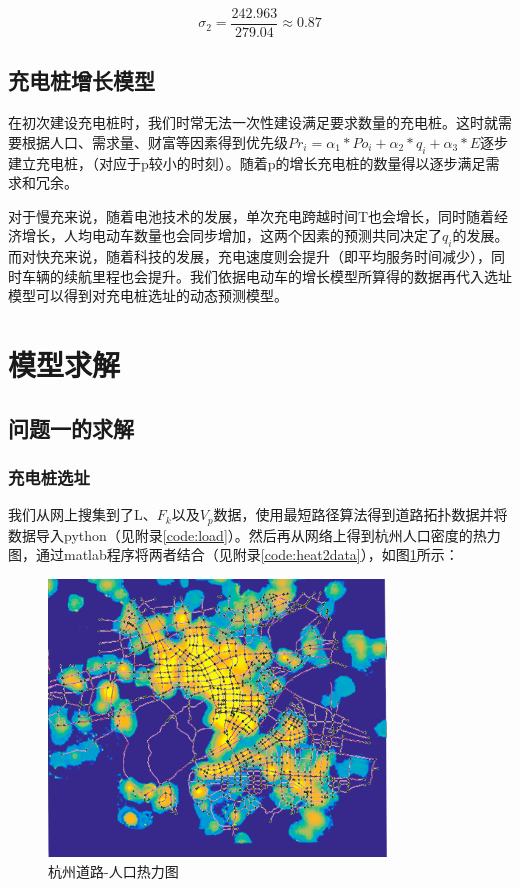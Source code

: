 \documentclass[12pt, a4paper, oneside]{ctexart}
\begin{document}
\begin{equation}
  \sigma_2= \frac{242.963}{279.04} \approx0.87
\end{equation}


\subsection{充电桩增长模型}
在初次建设充电桩时，我们时常无法一次性建设满足要求数量的充电桩。这时就需要根据人口、需求量、财富等因素得到优先级\(Pr_i=\alpha_1*Po_i+\alpha_2*q_i+\alpha_3*E\)逐步建立充电桩，（对应于p较小的时刻）。随着p的增长充电桩的数量得以逐步满足需求和冗余。

对于慢充来说，随着电池技术的发展，单次充电跨越时间T也会增长，同时随着经济增长，人均电动车数量也会同步增加，这两个因素的预测共同决定了\(q_i\)的发展。而对快充来说，随着科技的发展，充电速度则会提升（即平均服务时间减少），同时车辆的续航里程也会提升。我们依据电动车的增长模型所算得的数据再代入选址模型可以得到对充电桩选址的动态预测模型。



\section{模型求解}
\subsection{问题一的求解}
\subsubsection{充电桩选址}
我们从网上搜集到了L、\(F_k\)以及\(V_p\)数据，使用最短路径算法得到道路拓扑数据并将数据导入python（见附录\ref{code:load}）。然后再从网络上得到杭州人口密度的热力图，通过matlab程序将两者结合（见附录\ref{code:heat2data}），如图\ref{fig:heat}所示：

\begin{figure}[H]
    \centering
    \includegraphics[width=0.8\textwidth]{pic/杭州道路-热力图.png}
    \caption{杭州道路-人口热力图}
    \label{fig:heat}
\end{figure}
\end{document}
